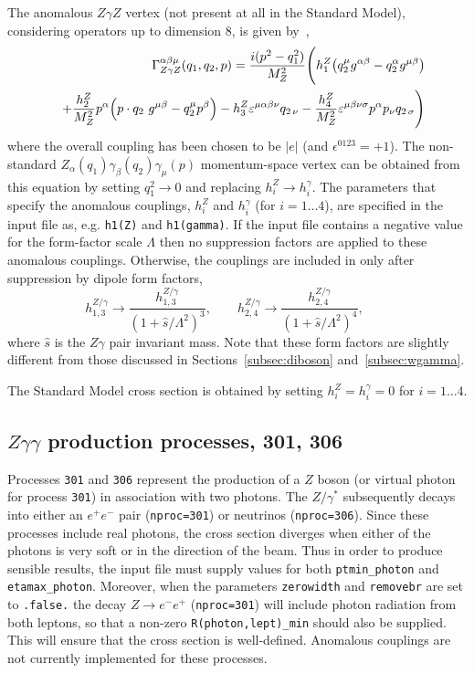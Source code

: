 \documentclass[12pt]{article}
\begin{document}
The anomalous $Z\gamma Z$ vertex (not present at all in the Standard Model),
considering operators up to dimension 8, is given by~\cite{DeFlorian:2000sg},
\begin{eqnarray}
 && \Gamma^{\alpha \beta \mu}_{Z \gamma Z}(q_1, q_2, p) = 
   \frac{i(p^2-q_1^2)}{M_Z^2} \Biggl( 
   h_1^Z \bigl( q_2^\mu g^{\alpha\beta} - q_2^\alpha g^{\mu \beta}
   \bigr)
    \nonumber \\ && + \frac{h_2^Z}{M_Z^2} p^\alpha \Bigl( p\cdot q_2\ g^{\mu\beta} -
            q_2^\mu p^\beta \Bigr)
   - h_3^Z \varepsilon^{\mu\alpha\beta\nu} q_{2\, \nu} 
   - \frac{h_4^Z}{M_Z^2} \varepsilon^{\mu\beta\nu\sigma} p^\alpha
p_\nu q_{2\, \sigma} \Biggl)
\end{eqnarray}
where the overall coupling has been chosen to be $|e|$ (and
$\epsilon^{0123}=+1$). The non-standard $Z_\alpha(q_1) \gamma_\beta(q_2)
\gamma_\mu(p)$ momentum-space vertex can be obtained from
this equation by setting $q_1^2 \to 0$ and replacing $h_i^Z \to
h_i^\gamma$. 
The parameters that
specify the anomalous couplings, $h_i^Z$ and $h_i^\gamma$ (for $i=1\ldots 4$), are
specified in the input file as, e.g. {\tt h1(Z)} and {\tt h1(gamma)}.
If the input file contains a negative value for the form-factor scale $\Lambda$
then no suppression factors are applied to these anomalous couplings.
Otherwise, the couplings are included
in \MCFM only after suppression by dipole form factors,
\begin{displaymath}
h_{1,3}^{Z/\gamma} \rightarrow
 \frac{h_{1,3}^{Z/\gamma}}{(1+\hat{s}/\Lambda^2)^3}, \qquad
h_{2,4}^{Z/\gamma} \rightarrow
 \frac{h_{2,4}^{Z/\gamma}}{(1+\hat{s}/\Lambda^2)^4}, \qquad
\end{displaymath}
where $\hat{s}$ is the $Z\gamma$ pair invariant mass. Note that these form factors are slightly
different from those discussed in Sections~\ref{subsec:diboson} and~\ref{subsec:wgamma}.

The Standard Model cross section is obtained by setting $h_i^Z = h_i^\gamma = 0$ for $i=1\ldots 4$.

\subsection{$Z\gamma\gamma$ production processes, 301, 306} 

Processes {\tt{301}} and {\tt{306}} represent the production of a $Z$ boson 
(or virtual photon for process {\tt 301}) in association with two photons.   The $Z/\gamma^*$ subsequently decays into 
either an $e^+ e^-$ pair ({\tt nproc=301}) or neutrinos ({\tt nproc=306}).
Since these processes include real photons, the cross section diverges
when either of the photons is very soft or in the direction of the beam.
Thus in order to produce sensible results, the input file must supply values for both
{\tt ptmin\_photon} and {\tt etamax\_photon}. Moreover, when the parameters {\tt zerowidth}
and {\tt removebr} are set to {\tt .false.} the decay $Z \to e^- e^+$ ({\tt nproc=301})
will include photon radiation from both leptons, so that a non-zero {\tt R(photon,lept)\_min}
should also be supplied. This will ensure that the cross section is well-defined.
Anomalous couplings are not currently implemented for these processes. 
\end{document}
